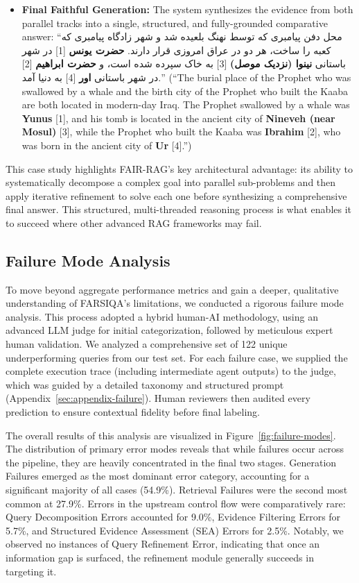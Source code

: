 \documentclass[11pt]{article}
\newcommand{\fa}[1]{\textfarsi{#1}}
\begin{document}
\begin{itemize}
\item \textbf{Final Faithful Generation:}
The system synthesizes the evidence from both parallel tracks into a single, structured, and fully-grounded comparative answer: ``\fa{محل دفن پیامبری که توسط نهنگ بلعیده شد و شهر زادگاه پیامبری که کعبه را ساخت، هر دو در عراق امروزی قرار دارند.} \textbf{\fa{حضرت یونس}} [1] \fa{در شهر باستانی} \textbf{\fa{نینوا (نزدیک موصل)}} [3] \fa{به خاک سپرده شده است، و} \textbf{\fa{حضرت ابراهیم}} [2] \fa{در شهر باستانی} \textbf{\fa{اور}} [4] \fa{به دنیا آمد.}'' (``The burial place of the Prophet who was swallowed by a whale and the birth city of the Prophet who built the Kaaba are both located in modern-day Iraq. The Prophet swallowed by a whale was \textbf{Yunus} [1], and his tomb is located in the ancient city of \textbf{Nineveh (near Mosul)} [3], while the Prophet who built the Kaaba was \textbf{Ibrahim} [2], who was born in the ancient city of \textbf{Ur} [4].'')
\end{itemize}

This case study highlights FAIR-RAG's key architectural advantage: its ability to systematically decompose a complex goal into parallel sub-problems and then apply iterative refinement to solve each one before synthesizing a comprehensive final answer. This structured, multi-threaded reasoning process is what enables it to succeed where other advanced RAG frameworks may fail.

\subsection{Failure Mode Analysis}

To move beyond aggregate performance metrics and gain a deeper, qualitative understanding of FARSIQA's limitations, we conducted a rigorous failure mode analysis. This process adopted a hybrid human-AI methodology, using an advanced LLM judge for initial categorization, followed by meticulous expert human validation. We analyzed a comprehensive set of 122 unique underperforming queries from our test set. For each failure case, we supplied the complete execution trace (including intermediate agent outputs) to the judge, which was guided by a detailed taxonomy and structured prompt (Appendix~\ref{sec:appendix-failure}). Human reviewers then audited every prediction to ensure contextual fidelity before final labeling.

The overall results of this analysis are visualized in Figure~\ref{fig:failure-modes}. The distribution of primary error modes reveals that while failures occur across the pipeline, they are heavily concentrated in the final two stages. Generation Failures emerged as the most dominant error category, accounting for a significant majority of all cases (54.9\%). Retrieval Failures were the second most common at 27.9\%. Errors in the upstream control flow were comparatively rare: Query Decomposition Errors accounted for 9.0\%, Evidence Filtering Errors for 5.7\%, and Structured Evidence Assessment (SEA) Errors for 2.5\%. Notably, we observed no instances of Query Refinement Error, indicating that once an information gap is surfaced, the refinement module generally succeeds in targeting it.
\end{document}
